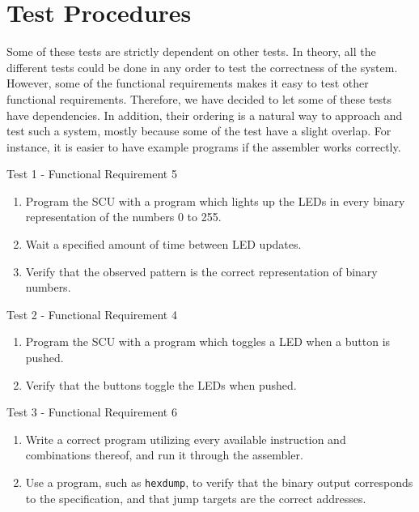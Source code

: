 \section{Test Procedures}

Some of these tests are strictly dependent on other tests. In theory, all the
different tests could be done in any order to test the correctness of the
system. However, some of the functional requirements makes it easy to test other
functional requirements. Therefore, we have decided to let some of these tests
have dependencies. In addition, their ordering is a natural way to approach and
test such a system, mostly because some of the test have a slight overlap. For
instance, it is easier to have example programs if the assembler works
correctly.

{\sc Test 1 - Functional Requirement 5}

{\em \FRV}

\begin{enumerate}
\item Program the \ac{SCU} with a program which lights up the \acp{LED} in every
  binary representation of the numbers 0 to 255.
\item Wait a specified amount of time between \ac{LED} updates.
\begin{comment}
{\sc \color{red}
  TODO: Is this needed?}
yes, else it would be done so fast we couldn't possibly see the results.
\end{comment}
\item Verify that the observed pattern is the correct representation of binary
  numbers.
\end{enumerate}

{\sc Test 2 - Functional Requirement 4}

{\em \FRIV}

\begin{enumerate}
\item Program the \ac{SCU} with a program which toggles a \ac{LED} when a button
  is pushed.
\item Verify that the buttons toggle the \acp{LED} when pushed.
\end{enumerate}

{\sc Test 3 - Functional Requirement 6}

{\em \FRVI}

\begin{enumerate}
\item Write a correct program utilizing every available instruction and
  combinations thereof, and run it through the assembler.
\item Use a program, such as {\tt hexdump}, to verify that the binary output
  corresponds to the specification, and that jump targets are the correct
  addresses.
\end{enumerate}

